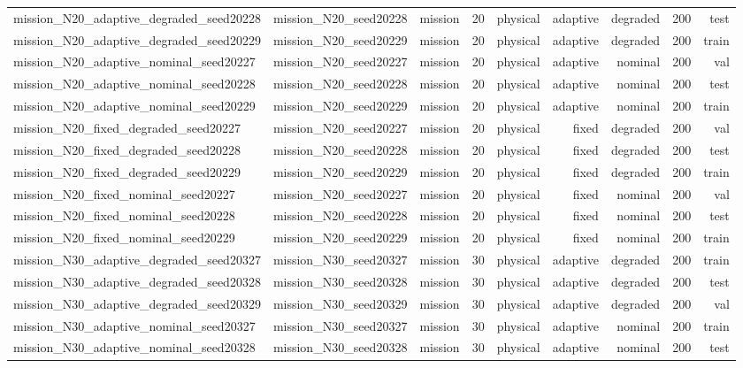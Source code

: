 \begin{tabular}{lrrrrrrrr}
mission\_N20\_adaptive\_degraded\_seed20228 & mission\_N20\_seed20228 & mission & 20 & physical & adaptive & degraded & 200 & test \\
mission\_N20\_adaptive\_degraded\_seed20229 & mission\_N20\_seed20229 & mission & 20 & physical & adaptive & degraded & 200 & train \\
mission\_N20\_adaptive\_nominal\_seed20227 & mission\_N20\_seed20227 & mission & 20 & physical & adaptive & nominal & 200 & val \\
mission\_N20\_adaptive\_nominal\_seed20228 & mission\_N20\_seed20228 & mission & 20 & physical & adaptive & nominal & 200 & test \\
mission\_N20\_adaptive\_nominal\_seed20229 & mission\_N20\_seed20229 & mission & 20 & physical & adaptive & nominal & 200 & train \\
mission\_N20\_fixed\_degraded\_seed20227 & mission\_N20\_seed20227 & mission & 20 & physical & fixed & degraded & 200 & val \\
mission\_N20\_fixed\_degraded\_seed20228 & mission\_N20\_seed20228 & mission & 20 & physical & fixed & degraded & 200 & test \\
mission\_N20\_fixed\_degraded\_seed20229 & mission\_N20\_seed20229 & mission & 20 & physical & fixed & degraded & 200 & train \\
mission\_N20\_fixed\_nominal\_seed20227 & mission\_N20\_seed20227 & mission & 20 & physical & fixed & nominal & 200 & val \\
mission\_N20\_fixed\_nominal\_seed20228 & mission\_N20\_seed20228 & mission & 20 & physical & fixed & nominal & 200 & test \\
mission\_N20\_fixed\_nominal\_seed20229 & mission\_N20\_seed20229 & mission & 20 & physical & fixed & nominal & 200 & train \\
mission\_N30\_adaptive\_degraded\_seed20327 & mission\_N30\_seed20327 & mission & 30 & physical & adaptive & degraded & 200 & train \\
mission\_N30\_adaptive\_degraded\_seed20328 & mission\_N30\_seed20328 & mission & 30 & physical & adaptive & degraded & 200 & test \\
mission\_N30\_adaptive\_degraded\_seed20329 & mission\_N30\_seed20329 & mission & 30 & physical & adaptive & degraded & 200 & val \\
mission\_N30\_adaptive\_nominal\_seed20327 & mission\_N30\_seed20327 & mission & 30 & physical & adaptive & nominal & 200 & train \\
mission\_N30\_adaptive\_nominal\_seed20328 & mission\_N30\_seed20328 & mission & 30 & physical & adaptive & nominal & 200 & test \\

\end{tabular}

